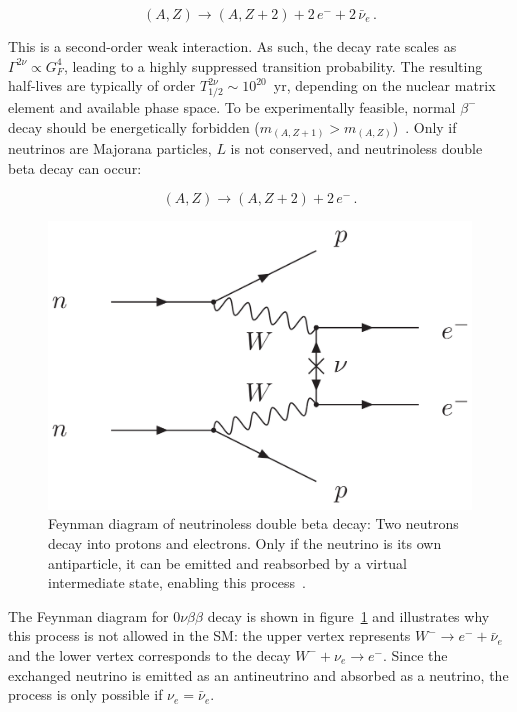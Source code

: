 \begin{equation} 
\label{eq:2vbb}
	(A, Z) \rightarrow (A, Z+2) + 2 \, e^- + 2 \, \bar{\nu}_e \,.
\end{equation}

\noindent This is a second-order weak interaction. As such, the decay rate scales as $\Gamma^{2 \nu} \propto G_F^4$, leading to a highly suppressed transition probability. The resulting half-lives are typically of order $T^{2 \nu}_{1/2} \sim 10^{20}$~yr, depending on the nuclear matrix element and available phase space. 
To be experimentally feasible, normal $\beta^{-}$ decay should be energetically forbidden ($m_{(A, Z+1)} > m_{(A, Z)}$)~\cite{zuber_neutrino_2020}. 
Only if neutrinos are Majorana particles, $L$ is not conserved, and neutrinoless double beta decay can occur: 


\begin{equation} 
\label{eq:0vbb}
	(A, Z) \rightarrow (A, Z+2) + 2 \, e^{-} \,.
\end{equation}


\begin{figure}[t]
    \centering
    \includegraphics[width=0.75\linewidth]{figures/02_neutrino/feynman_0vbb.png}
    \caption{Feynman diagram of neutrinoless double beta decay: Two neutrons decay into protons and electrons. Only if the neutrino is its own antiparticle, it can be emitted and reabsorbed by a virtual intermediate state, enabling this process~\cite{navas_review_2024}.}
    \label{fig:feynman_0vbb}
\end{figure}


The Feynman diagram for $0 \nu \beta \beta$ decay is shown in figure~\ref{fig:feynman_0vbb} and illustrates why this process is not allowed in the SM: the upper vertex represents $W^{-} \rightarrow e^- + \bar{\nu}_e$ and the lower vertex corresponds to the decay $W^{-} + \nu_e \rightarrow e^-$. Since the exchanged neutrino is emitted as an antineutrino and absorbed as a neutrino, the process is only possible if $\nu_e = \bar{\nu}_e$.

